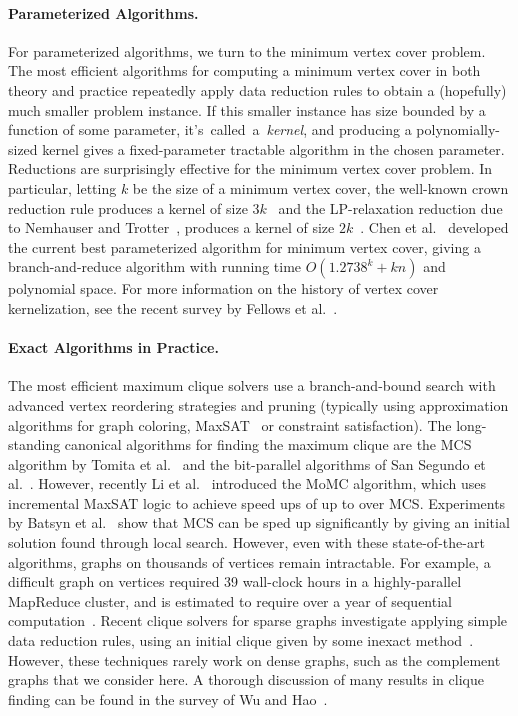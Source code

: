 \documentclass[twoside,leqno,twocolumn]{article}
\begin{document}
\paragraph*{Parameterized Algorithms.}
For parameterized algorithms, we turn to the minimum vertex cover problem. The most efficient algorithms for computing a minimum vertex cover in both theory and practice repeatedly apply data reduction rules to obtain a (hopefully) much smaller problem instance. If this smaller instance has size bounded by a function of some parameter, it's~called~a~\emph{kernel}, and producing a polynomially-sized kernel gives a fixed-parameter tractable algorithm in the chosen parameter. Reductions are surprisingly effective for the minimum vertex cover problem. In particular, letting $k$ be the size of a minimum vertex cover, the well-known crown reduction rule produces a kernel of size $3k$~\cite{chor2005linear} and the LP-relaxation reduction due to Nemhauser and Trotter~\cite{nemhauser-1975}, produces a kernel of size $2k$~\cite{chen1999}. Chen et al.~\cite{chen2010improved} developed the current best parameterized algorithm for minimum vertex cover, giving a branch-and-reduce algorithm with running time $O(1.2738^k +kn)$ and polynomial space.
For more information on the history of vertex cover kernelization, see the recent survey by Fellows et al.~\cite{fellows2018known}.

\paragraph*{Exact Algorithms in Practice.}
The most efficient maximum clique solvers use a branch-and-bound search with
advanced vertex reordering strategies and pruning (typically using approximation
algorithms for graph coloring, MaxSAT~\cite{li-maxsat-2013} or constraint
satisfaction). The long-standing canonical algorithms for finding the maximum
clique are the MCS algorithm by Tomita et al.~\cite{tomita-recoloring} and the
bit-parallel algorithms of San Segundo et
al.~\cite{segundo-recoloring,segundo-bitboard-2011}. However, recently Li et
al.~\cite{DBLP:journals/cor/LiJM17} introduced the MoMC algorithm, which uses
incremental MaxSAT logic to achieve speed ups of up to  over MCS.
Experiments by Batsyn et al.~\cite{batsyn-mcs-ils-2014} show that MCS can be
sped up significantly by giving an initial solution found through local search.
However, even with these state-of-the-art algorithms, graphs on thousands of
vertices remain intractable. For example, a difficult graph on  vertices required 39 wall-clock hours in a highly-parallel MapReduce cluster, and is estimated to require over a year of sequential computation~\cite{xiang-2013}. Recent clique solvers for sparse graphs investigate applying simple data reduction rules, using an initial clique given by some inexact method~\cite{verma2015solving,sansegundo2016a,chang2019efficient}. However, these techniques rarely work on dense graphs, such as the complement graphs that we consider here.
A thorough discussion of many results in clique finding can be found in the survey of Wu and Hao~\cite{wu-hao-2015}.
\end{document}

